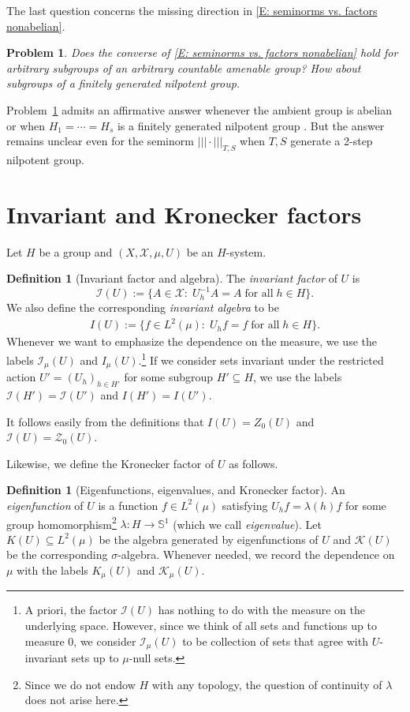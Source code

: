 \documentclass[11pt]{amsart}
\newtheorem{problem}{Problem}
\theoremstyle{definition}
\newtheorem{definition}[lemma]{Definition}
\renewcommand{\S}{\mathbb{S}}
\newcommand{\CI}{{\mathcal I}}
\newcommand{\CK}{{\mathcal K}}
\newcommand{\CX}{{\mathcal X}}
\newcommand{\CZ}{{\mathcal Z}}
\newcommand{\nnorm}[1]{\lvert\!|\!| #1|\!|\!\rvert}
\newcommand{\inv}{^{-1}}
\newcommand{\1}{{\mathbf{1}}}
\begin{document}
{The last question concerns the missing direction in \eqref{E: seminorms vs. factors nonabelian}.
\begin{problem}\label{Pr: nonobvious direction}
    Does the converse of \eqref{E: seminorms vs. factors nonabelian} hold for arbitrary subgroups of an arbitrary countable amenable group? How about subgroups of a finitely generated nilpotent group.
\end{problem}
Problem~\ref{Pr: nonobvious direction} admits an affirmative answer whenever the ambient group is abelian \cite[Theorem~2.4]{TZ16} or when $H_1 = \cdots = H_s$ is a finitely generated nilpotent group \cite[Theorem~3.21]{CS23}. But the answer remains unclear even for the seminorm $\nnorm{\cdot}_{T,S}$ when $T,S$ generate a 2-step nilpotent group.
}
\appendix

\section{Invariant and Kronecker factors}\label{A: Kronecker}
Let $H$ be a group and $(X, \CX, \mu, U)$ be an $H$-system. 
\begin{definition}[Invariant factor and algebra]\label{D: invariant}
    The \emph{invariant factor} of $U$ is $$\CI(U) := \{A\in \CX:\; U_h\inv A = A\; \textrm{for all}\; h\in H\}.$$
    We also define the corresponding \textit{invariant algebra} to be
    \begin{align*}
        I(U) := \{f\in L^2(\mu)\colon\; U_hf = f\; \textrm{for all}\; h\in H\}.
    \end{align*}
    Whenever we want to emphasize the dependence on the measure, we use the labels $\CI_\mu(U)$ and $I_\mu(U)$.\footnote{A priori, the factor $\CI(U)$ has nothing to do with the measure on the underlying space. However, since we think of all sets and functions up to measure 0, we consider $\CI_\mu(U)$ to be collection of sets that agree with $U$-invariant sets up to $\mu$-null sets.} If %
    we consider sets invariant under the restricted action $U'=(U_h)_{h\in H'}$ for some subgroup $H'\subseteq H$, we use the labels $\CI(H')=\CI(U')$ and $I(H')=I(U')$. 
\end{definition}

It follows easily from the definitions that $I(U) = Z_0(U)$ and $\CI(U) = \CZ_0(U)$.

Likewise, we define the Kronecker factor of $U$ as follows.
\begin{definition}[Eigenfunctions, eigenvalues, and Kronecker factor]
      An \textit{eigenfunction} of $U$ is a function $f\in L^2(\mu)$ satisfying $U_h f = \lambda(h)f$ for some group homomorphism\footnote{Since we do not endow $H$ with any topology, the question of continuity of $\lambda$ does not arise here.} $\lambda\colon H\to\S^1$ (which we call \textit{eigenvalue}). Let $K(U)\subseteq L^2(\mu)$ be the algebra generated by eigenfunctions of $U$ and $\CK(U)$ be the corresponding $\sigma$-algebra. Whenever needed, we record the dependence on $\mu$ with the labels $K_\mu(U)$ and $\CK_\mu(U)$.
\end{definition}
\end{document}

